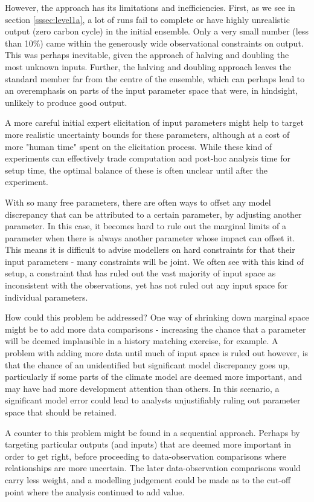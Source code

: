 \documentclass[gmd, manuscript]{copernicus}
\begin{document}
However, the approach has its limitations and inefficiencies. First, as we see in section \ref{sssec:level1a}, a lot of runs fail to complete or have highly unrealistic output (zero carbon cycle) in the initial ensemble. Only a very small number (less than 10\%) came within the generously wide observational constraints on output.  This was perhaps inevitable, given the approach of halving and doubling the most unknown inputs. Further, the halving and doubling approach leaves the standard member far from the centre of the ensemble, which can perhaps lead to an overemphasis on parts of the input parameter space that were, in hindsight, unlikely to produce good output.

A more careful initial expert elicitation of input parameters might help to target more realistic uncertainty bounds for these parameters, although at a cost of more "human time" spent on the elicitation process. While these kind of experiments can effectively trade computation and post-hoc analysis time for setup time, the optimal balance of these is often unclear until after the experiment.

With so many free parameters, there are often ways to offset any model discrepancy that can be attributed to a certain parameter, by adjusting another parameter. In this case, it becomes hard to rule out the marginal limits of a parameter when there is always another parameter whose impact can offset it. This means it is difficult to advise modellers on hard constraints for that their input parameters - many constraints will be joint. We often see with this kind of setup, a constraint that has ruled out the vast majority of input space as inconsistent with the observations, yet has not ruled out any input space for individual parameters.

How could this problem be addressed? One way of shrinking down marginal space might be to add more data comparisons - increasing the chance that a parameter will be deemed implausible in a history matching exercise, for example. A problem with adding more data until much of input space is ruled out however, is that the chance of an unidentified but significant model discrepancy goes up, particularly if some parts of the climate model are deemed more important, and may have had more development attention than others. In this scenario, a significant model error could lead to analysts unjustifiably ruling out parameter space that should be retained.

A counter to this problem might be found in a sequential approach. Perhaps by targeting particular outputs (and inputs) that are deemed more important in order to get right, before proceeding to data-observation comparisons where relationships are more uncertain. The later data-observation comparisons would carry less weight, and a modelling judgement could be made as to the cut-off point where the analysis continued to add value.
\end{document}

